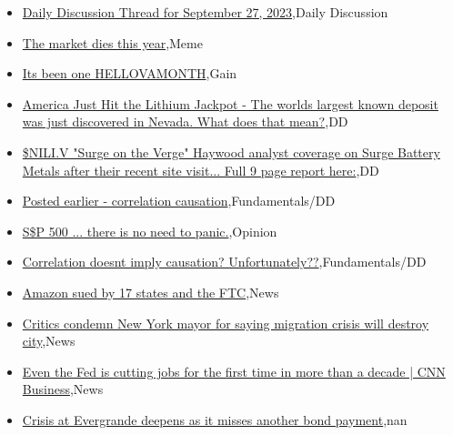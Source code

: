 \documentclass{article}%
\begin{document}
%
\begin{itemize}%
\item%
\href{https://reddit.com/r/wallstreetbets/comments/16tgffz/daily\_discussion\_thread\_for\_september\_27\_2023/}{Daily Discussion Thread for September 27, 2023},Daily Discussion%
\item%
\href{https://reddit.com/r/wallstreetbets/comments/16tchad/the\_market\_dies\_this\_year/}{The market dies this year},Meme%
\item%
\href{https://reddit.com/r/wallstreetbets/comments/16t9i0v/its\_been\_one\_hellovamonth/}{Its been one HELLOVAMONTH},Gain%
\item%
\href{https://reddit.com/r/Baystreetbets/comments/16sy7ew/america\_just\_hit\_the\_lithium\_jackpot\_the\_worlds/}{America Just Hit the Lithium Jackpot - The worlds largest known deposit was just discovered in Nevada. What does that mean?},DD%
\item%
\href{https://reddit.com/r/Baystreetbets/comments/16su64g/niliv\_surge\_on\_the\_verge\_haywood\_analyst\_coverage/}{\$NILI.V "Surge on the Verge" Haywood analyst coverage on Surge Battery Metals after their recent site visit... Full 9 page report here:},DD%
\item%
\href{https://reddit.com/r/StockMarket/comments/16t7pc2/posted\_earlier\_correlation\_causation/}{Posted earlier - correlation causation},Fundamentals/DD%
\item%
\href{https://reddit.com/r/StockMarket/comments/16syhbw/sp\_500\_there\_is\_no\_need\_to\_panic/}{S\$P 500 ... there is no need to panic.},Opinion%
\item%
\href{https://reddit.com/r/StockMarket/comments/16ss4ca/correlation\_doesnt\_imply\_causation\_unfortunately/}{Correlation doesnt imply causation? Unfortunately??},Fundamentals/DD%
\item%
\href{https://reddit.com/r/StockMarket/comments/16ss2zl/amazon\_sued\_by\_17\_states\_and\_the\_ftc/}{Amazon sued by 17 states and the FTC},News%
\item%
\href{https://reddit.com/r/Economics/comments/16tcnzh/critics\_condemn\_new\_york\_mayor\_for\_saying/}{Critics condemn New York mayor for saying migration crisis will destroy city},News%
\item%
\href{https://reddit.com/r/Economics/comments/16t7fmy/even\_the\_fed\_is\_cutting\_jobs\_for\_the\_first\_time/}{Even the Fed is cutting jobs  for the first time in more than a decade | CNN Business},News%
\item%
\href{https://reddit.com/r/Economics/comments/16t4wzb/crisis\_at\_evergrande\_deepens\_as\_it\_misses\_another/}{Crisis at Evergrande deepens as it misses another bond payment},nan%
\end{itemize}%
\end{document}
